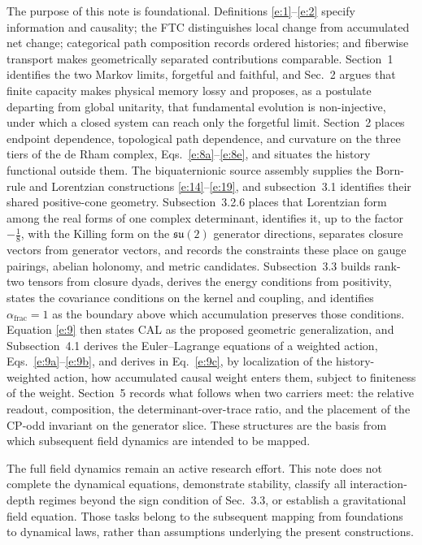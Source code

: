 \documentclass[10pt]{article}
\newcommand{\afrac}{\alpha_{\mathrm{frac}}}
\begin{document}
The purpose of this note is foundational. Definitions \eqref{e:1}--\eqref{e:2} specify information and causality; the FTC distinguishes local change from accumulated net change; categorical path composition records ordered histories; and fiberwise transport makes geometrically separated contributions comparable. Section~1 identifies the two Markov limits, forgetful and faithful, and Sec.~2 argues that finite capacity makes physical memory lossy and proposes, as a postulate departing from global unitarity, that fundamental evolution is non-injective, under which a closed system can reach only the forgetful limit. Section~2 places endpoint dependence, topological path dependence, and curvature on the three tiers of the de Rham complex, Eqs.~\eqref{e:8a}--\eqref{e:8e}, and situates the history functional outside them. The biquaternionic source assembly supplies the Born-rule and Lorentzian constructions \eqref{e:14}--\eqref{e:19}, and subsection~3.1 identifies their shared positive-cone geometry. Subsection~3.2.6 places that Lorentzian form among the real forms of one complex determinant, identifies it, up to the factor $-\frac18$, with the Killing form on the $\mathfrak{su}(2)$ generator directions, separates closure vectors from generator vectors, and records the constraints these place on gauge pairings, abelian holonomy, and metric candidates. Subsection~3.3 builds rank-two tensors from closure dyads, derives the energy conditions from positivity, states the covariance conditions on the kernel and coupling, and identifies $\afrac=1$ as the boundary above which accumulation preserves those conditions. Equation \eqref{e:9} then states CAL as the proposed geometric generalization, and Subsection~4.1 derives the Euler--Lagrange equations of a weighted action, Eqs.~\eqref{e:9a}--\eqref{e:9b}, and derives in Eq.~\eqref{e:9c}, by localization of the history-weighted action, how accumulated causal weight enters them, subject to finiteness of the weight. Section~5 records what follows when two carriers meet: the relative readout, composition, the determinant-over-trace ratio, and the placement of the CP-odd invariant on the generator slice. These structures are the basis from which subsequent field dynamics are intended to be mapped.

The full field dynamics remain an active research effort. This note does not complete the dynamical equations, demonstrate stability, classify all interaction-depth regimes beyond the sign condition of Sec.~3.3, or establish a gravitational field equation. Those tasks belong to the subsequent mapping from foundations to dynamical laws, rather than assumptions underlying the present constructions.
\end{document}
